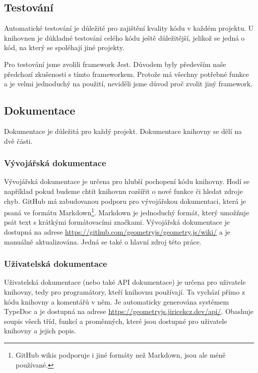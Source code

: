 \subsection{Testování}
\label{subsec:testing}

Automatické testování je důležité pro zajištění kvality kódu v každém projektu. 
U knihovnen je důkladné testování celého kódu ještě důležitější, jelikož se jedná o kód, na který se spoléhají jiné projekty.

Pro testování jsme zvolili framework Jest.
Důvodem byly především naše předchozí zkušenosti s tímto frameworkem.
Protože má všechny potřebné funkce a je velmi jednoduchý na použití, neviděli jsme důvod proč zvolit jiný framework.

\subsection{Dokumentace}
\label{subsec:documentation}

Dokumentace je důležitá pro každý projekt.
Dokumentace knihovny se dělí na dvě části.

\subsubsection{Vývojářská dokumentace}
\label{subsubsec:developer-documentation}

Vývojářská dokumentace je určena pro hlubší pochopení kódu knihovny.
Hodí se například pokud budeme chtít knihovnu rozšířit o nové funkce či hledat zdroje chyb.
GitHub má zabudovanou podporu pro vývojářskou dokumentaci\cite{GitHub:wikis}, která je psaná ve formátu Markdown\footnote{GitHub wikis podporuje i jiné formáty než Markdown, jsou ale méně používané.}.
Markdown je jednoduchý formát, který umožňuje psát text s krátkými formátovacími značkami\cite{GitHub:markdown}.
Vývojářská dokumentace je dostupná na adrese \url{https://github.com/geometryjs/geometry.js/wiki/} a je manuálně aktualizována. 
Jedná se také o hlavní zdroj této práce.

\subsubsection{Uživatelská dokumentace}
\label{subsubsec:user-documentation}

Uživatelská dokumentace (nebo také API dokumentace) je určena pro uživatele knihovny, tedy pro programátory, kteří knihovnu používají.
Ta vychází přímo z kódu knihovny a komentářů v něm.
Je automaticky generována systémem TypeDoc a je dostupná na adrese \url{https://geometryjs.jiricekcz.dev/api/}.
Obashuje soupis všech tříd, funkcí a proměnných, které jsou dostupné pro uživatele knihovny a jejich popis.
